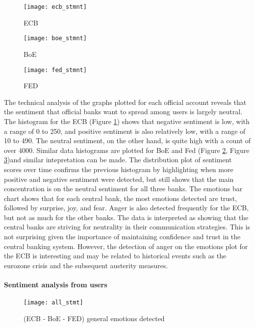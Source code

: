 \documentclass[fleqn,10pt]{SelfArx} %
\begin{document}
\begin{figure}[ht]\centering
	\texttt{[image: ecb\_stmnt]}
	\caption{ECB}
	\label{fig:ecb_stmnt}
\end{figure}

\begin{figure}[ht]\centering
	\texttt{[image: boe\_stmnt]}
	\caption{BoE}
	\label{fig:boe_stmnt}
\end{figure}

\begin{figure}[ht]\centering
	\texttt{[image: fed\_stmnt]}
	\caption{FED}
	\label{fig:fed_stmnt}
\end{figure}


The technical analysis of the graphs plotted for each official account reveals that the sentiment that official banks want to spread among users is largely neutral. The histogram for the ECB (Figure \ref{fig:ecb_stmnt}) shows that negative sentiment is low, with a range of 0 to 250, and positive sentiment is also relatively low, with a range of 10 to 490. The neutral sentiment, on the other hand, is quite high with a count of over 4000. Similar data histograms are plotted for BoE and Fed (Figure  \ref{fig:boe_stmnt}, Figure  \ref{fig:fed_stmnt})and similar intepretation can be made. The distribution plot of sentiment scores over time confirms the previous histogram by highlighting when more positive and negative sentiment were detected, but still shows that the main concentration is on the neutral sentiment for all three banks. The emotions bar chart shows that for each central bank, the most emotions detected are trust, followed by surprise, joy, and fear. Anger is also detected frequently for the ECB, but not as much for the other banks. The data is interpreted as showing that the central banks are striving for neutrality in their communication strategies. This is not surprising given the importance of maintaining confidence and trust in the central banking system. However, the detection of anger on the emotions plot for the ECB is interesting and may be related to historical events such as the eurozone crisis and the subsequent austerity measures.

\paragraph{Sentiment analysis from users}


\begin{figure}[ht]\centering
	\texttt{[image: all\_stmt]}
	\caption{(ECB - BoE - FED) general emotions detected}
	\label{fig:ecb-boe-fed_stmnt}
\end{figure}
\end{document}
